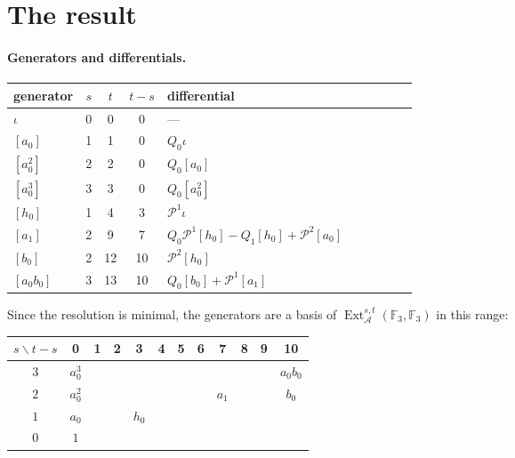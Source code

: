 \documentclass[11pt]{article}
\renewcommand{\P}{\mathcal{P}}
\newcommand{\F}{\mathbb{F}_3}
\newcommand{\A}{\mathcal{A}}
\DeclareMathOperator{\Ext}{Ext}
\begin{document}
\section{The result}

\paragraph{Generators and differentials.}
\begin{center}\small
\begin{longtable}{lccc>{\raggedright\arraybackslash}p{0.62\linewidth}}
\toprule
generator & $s$ & $t$ & $t-s$ & differential \\
\midrule\endhead
$\iota$ & 0 & 0 & 0 & --- \\
$[a_0]$ & 1 & 1 & 0 & $Q_{0}\iota$ \\
$[a_0^2]$ & 2 & 2 & 0 & $Q_{0}[a_0]$ \\
$[a_0^3]$ & 3 & 3 & 0 & $Q_{0}[a_0^2]$ \\
$[h_0]$ & 1 & 4 & 3 & $\P^{1}\iota$ \\
$[a_1]$ & 2 & 9 & 7 & $Q_{0}\P^{1}[h_0] - Q_{1}[h_0] + \P^{2}[a_0]$ \\
$[b_0]$ & 2 & 12 & 10 & $\P^{2}[h_0]$ \\
$[a_0b_0]$ & 3 & 13 & 10 & $Q_{0}[b_0] + \P^{1}[a_1]$ \\
\bottomrule
\end{longtable}
\end{center}
Since the resolution is minimal, the generators are a basis of $\Ext_\A^{s,t}(\F, \F)$ in this range:
\begin{center}\footnotesize\setlength{\tabcolsep}{3pt}
\begin{tabular}{c|ccccccccccc}
$s \backslash t-s$ & 0 & 1 & 2 & 3 & 4 & 5 & 6 & 7 & 8 & 9 & 10 \\
\midrule
$3$ & $a_0^3$ &  &  &  &  &  &  &  &  &  & $a_0b_0$ \\
$2$ & $a_0^2$ &  &  &  &  &  &  & $a_1$ &  &  & $b_0$ \\
$1$ & $a_0$ &  &  & $h_0$ &  &  &  &  &  &  &  \\
$0$ & $1$ &  &  &  &  &  &  &  &  &  &  \\
\end{tabular}
\end{center}
\end{document}
